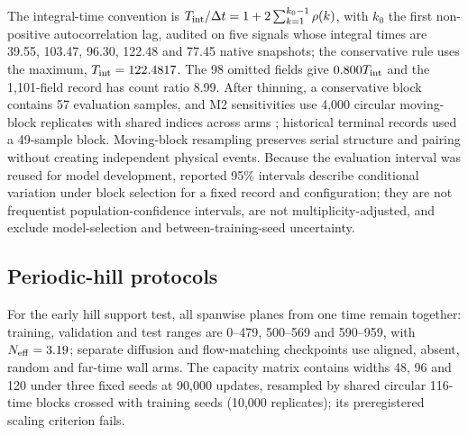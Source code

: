 The integral-time convention is $T_{\rm int}/\Delta t=1+2\sum_{k=1}^{k_0-1}\rho(k)$, with $k_0$
the first non-positive autocorrelation lag, audited on five signals whose integral times are
39.55, 103.47, 96.30, 122.48 and 77.45 native snapshots; the conservative rule uses the maximum,
$T_{\rm int}=122.4817$. The 98 omitted fields give $0.800T_{\rm int}$ and the 1,101-field record
has count ratio 8.99. After thinning, a conservative block contains 57 evaluation samples, and M2
sensitivities use 4,000 circular moving-block replicates with shared indices across arms
\cite{kunsch1989,politis1992circular}; historical terminal records used a 49-sample block. Moving-block resampling
preserves serial structure and pairing without creating independent physical events. Because
the evaluation interval was reused for model development, reported 95\% intervals describe
conditional variation under block selection for a fixed record and configuration; they are not
frequentist population-confidence intervals, are not multiplicity-adjusted, and exclude
model-selection and between-training-seed uncertainty.

\subsection{Periodic-hill protocols}\label{sec:supportmethods}\label{sec:groupedmethods}

For the early hill support test, all spanwise planes from one time remain together: training,
validation and test ranges are 0--479, 500--569 and 590--959, with $N_{\rm eff}=3.19$; separate
diffusion and flow-matching checkpoints use aligned, absent, random and far-time wall arms. The
capacity matrix contains widths 48, 96 and 120 under three fixed seeds at 90,000 updates,
resampled by shared circular 116-time blocks crossed with training seeds (10,000 replicates); its
preregistered scaling criterion fails.


